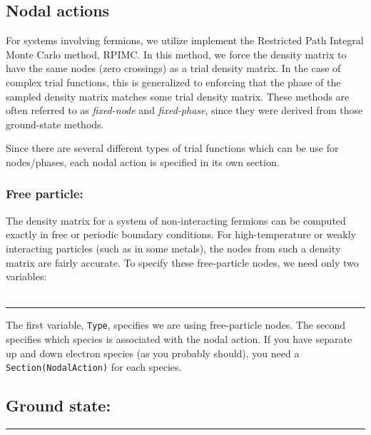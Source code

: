 \documentclass{book}
\begin{document}
\subsection{Nodal actions}
For systems involving fermions, we utilize implement the Restricted
Path Integral Monte Carlo method, RPIMC.  In this method, we force the
density matrix to have the same nodes (zero crossings) as a trial
density matrix.  In the case of complex trial functions, this is
generalized to enforcing that the phase of the sampled density matrix
matches some trial density matrix.  These methods are often referred
to as {\em fixed-node} and {\em fixed-phase}, since they were derived
from those ground-state methods.  

Since there are several different types of trial functions which can
be use for nodes/phases, each nodal action is specified in its own
section.  
\subsubsection{Free particle:}
The density matrix for a system of non-interacting fermions can be
computed exactly in free or periodic boundary conditions.  For
high-temperature or weakly interacting particles (such as in some
metals), the nodes from such a density matrix are fairly accurate.  To
specify these free-particle nodes, we need only two variables: \\ \\
\rule{0.6cm}{0cm}
The first variable, \texttt{Type}, specifies we are using
free-particle nodes.  The second specifies which species is associated
with the nodal action.  If you have separate up and down electron
species (as you probably should), you need a
\texttt{Section(NodalAction)} for each species.

\subsection{Ground state:}
\rule{0.0cm}{0.75cm}\rule{0.6cm}{0cm}
\end{document}
